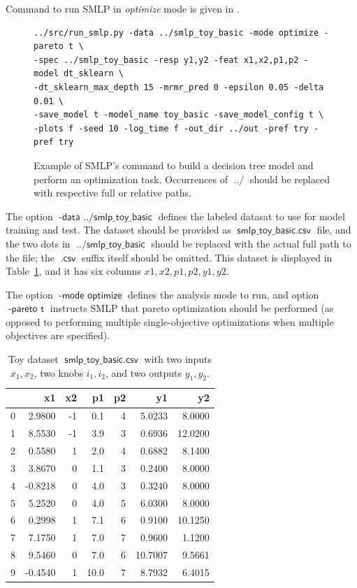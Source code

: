 \documentclass[a4paper,parskip=half]{article} %
\newcommand*\option[1]{\operatorname{\mathsf{#1}}} %
\newcommand*\optionval[2]{\operatorname{\mathsf{#1}\,\,\mathsf{#2}}} %
\newcommand*\suffix[1]{\operatorname{\mathsf{#1}}} %
\begin{document}
Command to run SMLP in \emph{optimize} mode is given in .

\begin{figure}[hb!]
\begin{verbatim}
../src/run_smlp.py -data ../smlp_toy_basic -mode optimize -pareto t \
-spec ../smlp_toy_basic -resp y1,y2 -feat x1,x2,p1,p2 -model dt_sklearn \
-dt_sklearn_max_depth 15 -mrmr_pred 0 -epsilon 0.05 -delta 0.01 \
-save_model t -model_name toy_basic -save_model_config t \
-plots f -seed 10 -log_time f -out_dir ../out -pref try -pref try
\end{verbatim}
\caption{Example of SMLP's command to build a decision tree model and perform an optimization task. 
Occurrences of $\suffix{../}$ should be replaced with respective full or relative paths.}
\label{fig:command}
\end{figure}

The option $\optionval{-data}{../smlp\_toy\_basic}$ defines the labeled datasat to use for model training and test.
The dataset should be provided as $\option{smlp\_toy\_basic.csv}$ file, and the two dots in $\option{../smlp\_toy\_basic}$ 
should be replaced with the actual full path to the file;  the $\suffix{.csv}$ suffix itself should be omitted.
This dataset is displayed in Table~\ref{toy_basic_df}, and it has six columns $x1, x2, p1, p2, y1, y2$.

The option $\optionval{-mode}{optimize}$ defines the analysis mode to run, and option $\optionval{-pareto}{t}$
instructs SMLP that pareto optimization should be performed (as opposed to performing multiple single-objective 
optimizations when multiple objectives are specified). 

\begin{table}[t]
\centering\small
\begin{tabular}{lrrrrrr}
\hline %
{} &      x1 &  x2 &    p1 &  p2 &       y1 &       y2 \\
\hline %
0 &  2.9800 &  -1 &   0.1 &   4 &   5.0233 &   8.0000 \\
1 &  8.5530 &  -1 &   3.9 &   3 &   0.6936 &  12.0200 \\
2 &  0.5580 &   1 &   2.0 &   4 &   0.6882 &   8.1400 \\
3 &  3.8670 &   0 &   1.1 &   3 &   0.2400 &   8.0000 \\
4 & -0.8218 &   0 &   4.0 &   3 &   0.3240 &   8.0000 \\
5 &  5.2520 &   0 &   4.0 &   5 &   6.0300 &   8.0000 \\
6 &  0.2998 &   1 &   7.1 &   6 &   0.9100 &  10.1250 \\
7 &  7.1750 &   1 &   7.0 &   7 &   0.9600 &   1.1200 \\
8 &  9.5460 &   0 &   7.0 &   6 &  10.7007 &   9.5661 \\
9 & -0.4540 &   1 &  10.0 &   7 &   8.7932 &   6.4015 \\
\hline %
\end{tabular}
\caption{Toy dataset $\option{smlp\_toy\_basic.csv}$ with two inputs $x_1, x_2$, two knobs $i_1, i_2$, and two outputs $y_1, y_2$.}
\label{toy_basic_df}
\end{table}
\end{document}
